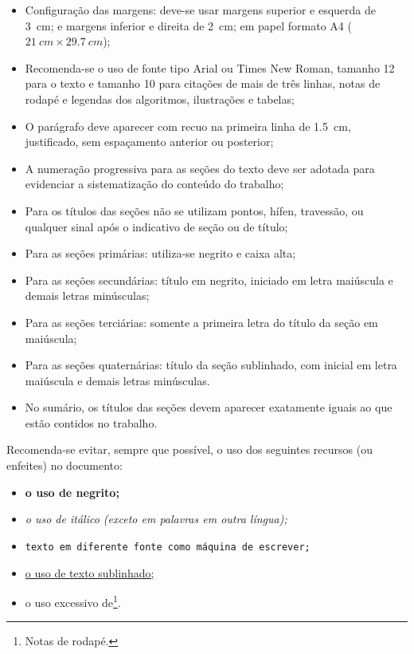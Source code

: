 \begin{itemize}%
    \item Configuração das margens: deve-se usar margens superior e esquerda de \SI{3}{cm}; e margens inferior e direita de \SI{2}{cm}; em papel formato A4 ($\SI{21}{cm} \times \SI{29,7}{cm}$);
    \item Recomenda-se o uso de fonte tipo Arial ou Times New Roman, tamanho 12 para o texto e tamanho 10 para citações de mais de três linhas, notas de rodapé e legendas dos algoritmos, ilustrações e tabelas;
    \item O parágrafo deve aparecer com recuo na primeira linha de \SI{1,5}{cm}, justificado, sem espaçamento anterior ou posterior;
    \item A numeração progressiva para as seções do texto deve ser adotada para evidenciar a sistematização do conteúdo do trabalho;
    \item Para os títulos das seções não se utilizam pontos, hífen, travessão, ou qualquer sinal após o indicativo de seção ou de título;
    \item Para as seções primárias: utiliza-se negrito e caixa alta;
    \item Para as seções secundárias: título em negrito, iniciado em letra maiúscula e demais letras minúsculas;
    \item Para as seções terciárias: somente a primeira letra do título da seção em
          maiúscula;
    \item Para as seções quaternárias: título da seção sublinhado, com inicial em letra maiúscula e demais letras minúsculas.
    \item No sumário, os títulos das seções devem aparecer exatamente iguais ao que estão contidos no trabalho.
\end{itemize}


Recomenda-se evitar, sempre que possível, o uso dos seguintes recursos (ou enfeites) no documento:

\begin{itemize}%
    \item \textbf{o uso de negrito;}
    \item \textit{o uso de itálico (exceto em palavras em outra língua);}
    \item \texttt{texto em diferente fonte como máquina de escrever;}
    \item \underline{o uso de texto sublinhado;}
    \item o uso excessivo de\footnote{Notas de rodapé.}.
\end{itemize}


